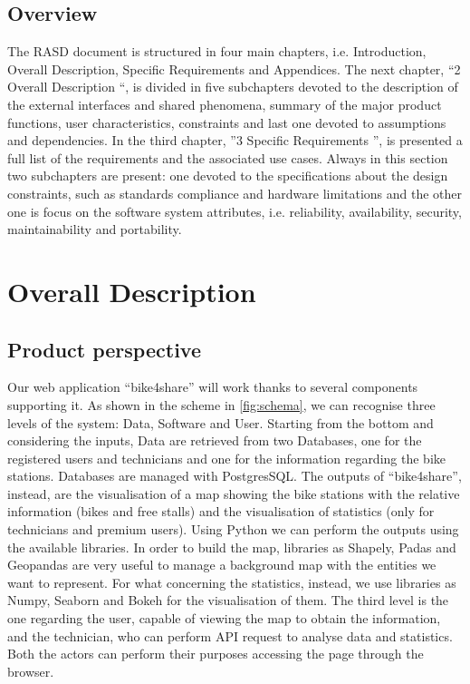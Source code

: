 \documentclass{article}
\begin{document}
\subsection{Overview}
The RASD document is structured in four main chapters, i.e. Introduction, Overall Description, Specific Requirements and Appendices. The next chapter, “2 Overall Description “, is divided in five subchapters devoted to the description of the external interfaces and shared phenomena, summary of the major product functions, user characteristics, constraints and last one devoted to assumptions and dependencies.
In the third chapter, ”3 Specific Requirements ”, is presented a full list of the requirements and the associated use cases. Always in this section two subchapters are present: one devoted to the specifications about the design constraints, such as standards compliance and hardware limitations and the other one is focus on the software system attributes, i.e. reliability, availability, security, maintainability and portability.

\section{Overall Description}
\subsection{Product perspective}
Our web application “bike4share” will work thanks to several components supporting it. As shown in the scheme in \ref{fig:schema}, we can recognise three levels of the system: Data, Software and User. 
Starting from the bottom and considering the inputs, Data are retrieved from two Databases, one for the registered users and technicians and one for the information regarding the bike stations. Databases are managed with PostgresSQL.
The outputs of “bike4share”, instead, are the visualisation of a map showing the bike stations with the relative information (bikes and free stalls) and the visualisation of statistics (only for technicians and premium users). Using Python we can perform the outputs using the available libraries. In order to build the map, libraries as Shapely, Padas and Geopandas are very useful to manage a background map with the entities we want to represent. For what concerning the statistics, instead, we use libraries as Numpy, Seaborn and Bokeh for the visualisation of them. The third level is the one regarding the user, capable of viewing the map to obtain the information, and the technician, who can perform API request to analyse data and statistics. Both the actors can perform their purposes accessing the page through the browser. 
\end{document}
